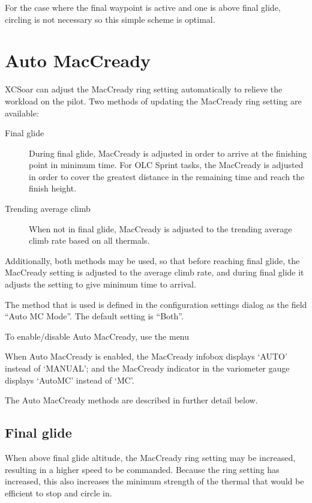 For the case where the final waypoint is active and one is above final
glide, circling is not necessary so this simple scheme is optimal.

\section{Auto MacCready}\label{sec:auto-maccready}

XCSoar can adjust the MacCready ring setting automatically to relieve the
workload on the pilot.  Two methods of updating the MacCready ring setting
are available:
\begin{description}
\item[Final glide]  During final glide, MacCready is adjusted in order to
 arrive at the finishing point in minimum time.  For OLC Sprint tasks,
 the MacCready is adjusted in order to cover the greatest distance in the remaining
 time and reach the finish height.
\item[Trending average climb] When not in final glide, MacCready is adjusted
to the trending average climb rate based on all thermals.
\end{description}
Additionally, both methods may be used, so that before reaching final glide,
the MacCready setting is adjusted to the average climb rate, and during final
glide it adjusts the setting to give minimum time to arrival.

The method that is used is defined in the configuration settings dialog as the
field ``Auto MC Mode''.  The default setting is ``Both''.

To enable/disable Auto MacCready, use the menu
\begin{quote}
\blink{}
\end{quote}

When Auto MacCready is enabled, the MacCready infobox displays `AUTO'
instead of `MANUAL'; and the MacCready indicator in the variometer
gauge displays `AutoMC' instead of `MC'.

The Auto MacCready methods are described in further detail below.

\subsection*{Final glide}
When above final glide altitude, the MacCready ring setting may be
increased, resulting in a higher speed to be commanded.  Because the
ring setting has increased, this also increases the minimum strength
of the thermal that would be efficient to stop and circle in.

